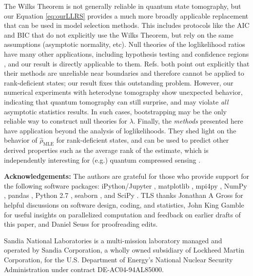 \documentclass[aps,pra, twocolumn]{revtex4}
\newcommand{\rhohat}{\hat{\rho}}
\newcommand{\rhoMLE}{\rhohat_{\scriptscriptstyle\mathrm{MLE}}}
\begin{document}
The Wilks Theorem is not generally reliable in quantum state tomography, but our Equation \eqref{eq:ourLLRS} provides a much more broadly applicable replacement that can be used in model selection methods.  This includes protocols like the AIC and BIC \cite{Akaike1974, Schwarz1978, Burnham2004} that do not explicitly use the Wilks Theorem, but rely on the same assumptions (asymptotic normality, etc).  Null theories of the loglikelihood ratios have many other applications, including hypothesis testing \cite{Blume-Kohout2010,Moroder2013} and confidence regions \cite{Glancy2012a}, and our result is directly applicable to them.  Refs. \cite{Moroder2013,Glancy2012a} both point out explicitly that their methods are unreliable near boundaries and therefore cannot be applied to rank-deficient states; our result fixes this outstanding problem.  However, our numerical experiments with heterodyne tomography show unexpected behavior, indicating that quantum tomography can still surprise, and may violate \emph{all} asymptotic statistics results.  In such cases, bootstrapping \cite{Efron1979} may be the only reliable way to construct null theories for $\lambda$.  Finally, the \emph{methods} presented here have application beyond the analysis of loglikelihoods.  They shed light on the behavior of $\rhoMLE$ for rank-deficient states, and can be used to predict other derived properties such as the average rank of the estimate, which is independently interesting for (e.g.) quantum compressed sensing \cite{Flammia2012a, Kalev2015, Kalev2015a}.

\noindent\textbf{Acknowledgements:} The authors are grateful for those who provide support for the following software packages: iPython/Jupyter \cite{Perez}, matplotlib
\cite{Hunter2007}, mpi4py \cite{Dalcin2005},  NumPy \cite{VanDerWalt2011}, pandas \cite{mckinney2010}, Python 2.7 
\cite{vanRossum}, seaborn \cite{Waskom2016}, and SciPy \cite{Oliphant2007a}. TLS thanks Jonathan A Gross for helpful 
discussions on software design, coding, and statistics, John King Gamble for useful insights on parallelized 
computation and feedback on earlier drafts of this paper, and Daniel Seuss for proofreading edits.

Sandia National Laboratories is a multi-mission laboratory managed and operated by Sandia Corporation, a wholly owned 
subsidiary of Lockheed Martin Corporation, for the U.S. Department of Energy's National Nuclear Security Administration 
under contract DE-AC04-94AL85000.



\end{document}
